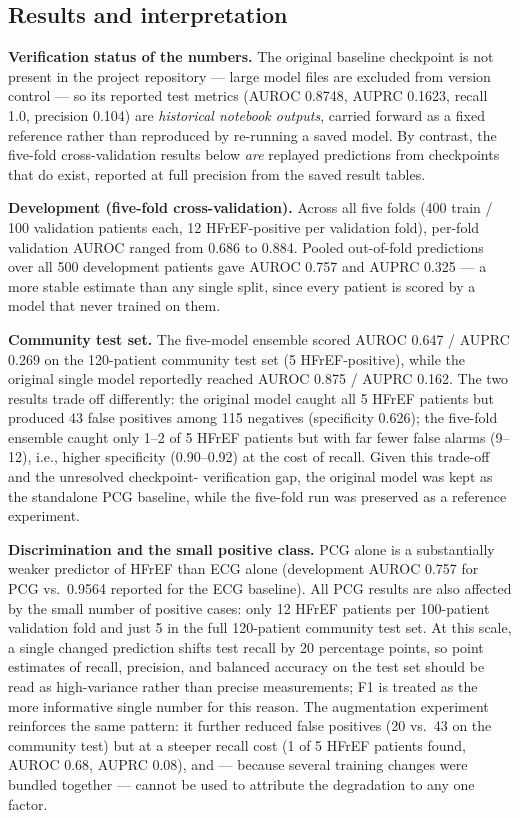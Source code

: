 \documentclass[11pt,a4paper]{article}
\begin{document}
\subsection{Results and interpretation}
\label{sec:pcg-results}
\textbf{Verification status of the numbers.} The original baseline checkpoint
is not present in the project repository --- large model files are excluded
from version control --- so its reported test metrics (AUROC 0.8748, AUPRC
0.1623, recall 1.0, precision 0.104) are \emph{historical notebook outputs},
carried forward as a fixed reference rather than reproduced by re-running a
saved model. By contrast, the five-fold cross-validation results below
\emph{are} replayed predictions from checkpoints that do exist, reported at
full precision from the saved result tables.

\textbf{Development (five-fold cross-validation).} Across all five folds (400
train / 100 validation patients each, 12 HFrEF-positive per validation fold),
per-fold validation AUROC ranged from 0.686 to 0.884. Pooled out-of-fold
predictions over all 500 development patients gave AUROC 0.757 and AUPRC
0.325 --- a more stable estimate than any single split, since every patient
is scored by a model that never trained on them.

\textbf{Community test set.} The five-model ensemble scored AUROC 0.647 /
AUPRC 0.269 on the 120-patient community test set (5 HFrEF-positive), while
the original single model reportedly reached AUROC 0.875 / AUPRC 0.162. The
two results trade off differently: the original model caught all 5 HFrEF
patients but produced 43 false positives among 115 negatives (specificity
0.626); the five-fold ensemble caught only 1--2 of 5 HFrEF patients but with
far fewer false alarms (9--12), i.e., higher specificity (0.90--0.92) at the
cost of recall. Given this trade-off and the unresolved checkpoint-
verification gap, the original model was kept as the standalone PCG
baseline, while the five-fold run was preserved as a reference experiment.

\textbf{Discrimination and the small positive class.} PCG alone is a
substantially weaker predictor of HFrEF than ECG alone (development AUROC
0.757 for PCG vs.\ 0.9564 reported for the ECG baseline). All PCG results are
also affected by the small number of positive cases: only 12 HFrEF patients
per 100-patient validation fold and just 5 in the full 120-patient community
test set. At this scale, a single changed prediction shifts test recall by
20 percentage points, so point estimates of recall, precision, and balanced
accuracy on the test set should be read as high-variance rather than
precise measurements; F1 is treated as the more informative single number
for this reason. The augmentation experiment reinforces the same pattern: it
further reduced false positives (20 vs.\ 43 on the community test) but at a
steeper recall cost (1 of 5 HFrEF patients found, AUROC 0.68, AUPRC 0.08),
and --- because several training changes were bundled together --- cannot be
used to attribute the degradation to any one factor.
\end{document}
